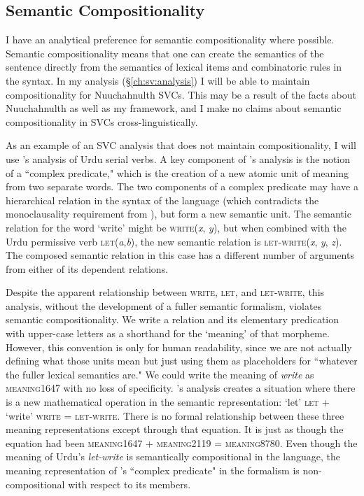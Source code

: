 \subsection{Semantic Compositionality} \label{ch:sv:def:compositionality}

I have an analytical preference for semantic compositionality where possible. Semantic compositionality means that one can create the semantics of the sentence directly from the semantics of lexical items and combinatoric rules in the syntax. In my analysis (\S\ref{ch:sv:analysis}) I will be able to maintain compositionality for Nuuchahnulth SVCs. This may be a result of the facts about Nuuchahnulth as well as my framework, and I make no claims about semantic compositionality in SVCs cross-linguistically.

As an example of an SVC analysis that does not maintain compositionality, I will use \cite{butt1995}'s analysis of Urdu serial verbs.  A key component of \citeauthor{butt1995}'s analysis is the notion of a ``complex predicate," which is the creation of a new atomic unit of meaning from two separate words. The two components of a complex predicate may have a hierarchical relation in the syntax of the language (which contradicts the monoclausality requirement from \cite{aikhenvalddixon2006}), but form a new semantic unit. The semantic relation for the word `write' might be \textsc{write}(\textit{x}, \textit{y}), but when combined with the Urdu permissive verb \textsc{let}(\textit{a},\textit{b}), the new semantic relation is \textsc{let-write}(\textit{x}, \textit{y}, \textit{z}). The composed semantic relation in this case has a different number of arguments from either of its dependent relations.

Despite the apparent relationship between \textsc{write}, \textsc{let}, and \textsc{let-write}, this analysis, without the development of a fuller semantic formalism, violates semantic compositionality. We write a relation and its elementary predication with upper-case letters as a shorthand for the `meaning' of that morpheme. However, this convention is only for human readability, since we are not actually defining what those units mean but just using them as placeholders for ``whatever the fuller lexical semantics are." We could write the meaning of \textit{write} as \textsc{meaning1647} with no loss of specificity. \citeauthor{butt1995}'s analysis creates a situation where there is a new mathematical operation in the semantic representation: `let' \textsc{let} + `write' \textsc{write} = \textsc{let-write}. There is no formal relationship between these three meaning representations except through that equation. It is just as though the equation had been \textsc{meaning1647} + \textsc{meaning2119} = \textsc{meaning8780}. Even though the meaning of Urdu's \textit{let-write} is semantically compositional in the language, the meaning representation of \citeauthor{butt1995}'s ``complex predicate" in the formalism is non-compositional with respect to its members.

